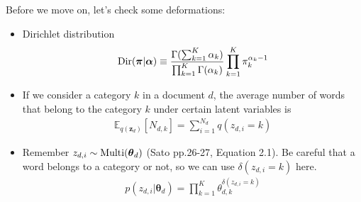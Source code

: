 \documentclass[a4paper,10.5pt,dvipdfmx]{jarticle}  %
\begin{document}
Before we move on, let's check some deformations:
\begin{itemize}
\item Dirichlet distribution
\begin{align}
	{\rm Dir}(\boldsymbol{\pi} | \boldsymbol{\alpha}) \equiv \frac{\Gamma(\sum_{k=1}^{K} \alpha_k)}{\prod_{k=1}^{K} \Gamma(\alpha_k)} \prod_{k=1}^{K} \pi_{k}^{\alpha_k - 1} 
\end{align}
\item If we consider a category $k$ in a document $d$, the average number of words that belong to the category $k$ under certain latent variables is
\begin{align}
	\mathbb{E}_{q(\boldsymbol{z}_d)}[N_{d,k}] = \sum_{i=1}^{N_d} q(z_{d,i} = k) \label{Eq:N_dk}
\end{align}
\item Remember $z_{d,i} \sim {\rm Multi}(\boldsymbol{\theta}_d)$ (Sato pp.26-27, Equation 2.1). Be careful that a word belongs to a category or not, so we can use $\delta(z_{d,i}=k)$ here.
\begin{align}
	p(z_{d,i} | \boldsymbol{\theta}_d) = \prod_{k=1}^{K} \theta_{d,k}^{\delta(z_{d,i} = k)}
\end{align}
\end{itemize}
\end{document}
